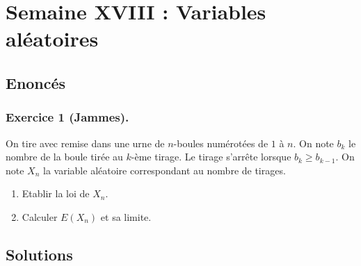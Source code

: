 \documentclass{article}
\begin{document}
\newpage

\section{Semaine XVIII : Variables aléatoires}
\subsection*{Enoncés}
\subsubsection*{Exercice 1 (Jammes).}
On tire avec remise dans une urne de $n$-boules numérotées de $1$ à $n$. On note $b_k$ le nombre de la boule tirée au $k$-ème tirage. Le tirage s'arrête lorsque $b_k\geq b_{k-1}$. On note $X_n$ la variable aléatoire correspondant au nombre de tirages.
\begin{enumerate}
\item Etablir la loi de $X_n$.
\item Calculer $E(X_n)$ et sa limite.
\end{enumerate}
\subsection*{Solutions} 
\end{document}
